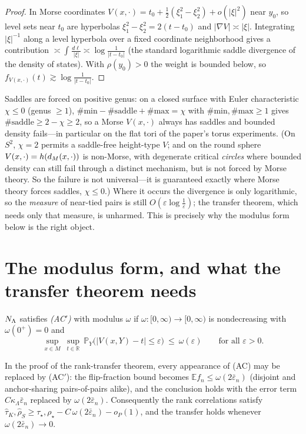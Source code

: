 \begin{proof}
In Morse coordinates $V(x,\cdot)=t_0+\tfrac12(\xi_1^2-\xi_2^2)+o(\lvert\xi\rvert^2)$ near
$y_0$, so level sets near $t_0$ are hyperbolas $\xi_1^2-\xi_2^2=2(t-t_0)$ and
$\lvert\nabla V\rvert\asymp\lvert\xi\rvert$. Integrating $\lvert\xi\rvert^{-1}$ along a
level hyperbola over a fixed coordinate neighborhood gives a contribution
$\asymp\int^{}\!\frac{d\ell}{\lvert\xi\rvert}\asymp\log\frac1{\lvert t-t_0\rvert}$ (the
standard logarithmic saddle divergence of the density of states). With $\rho(y_0)>0$ the
weight is bounded below, so $f_{V(x,\cdot)}(t)\gtrsim\log\frac1{\lvert t-t_0\rvert}$.
\end{proof}

Saddles are forced on positive genus: on a closed surface with Euler characteristic
$\chi\le0$ (genus $\ge1$), $\#\mathrm{min}-\#\mathrm{saddle}+\#\mathrm{max}=\chi$ with
$\#\mathrm{min},\#\mathrm{max}\ge1$ gives $\#\mathrm{saddle}\ge2-\chi\ge2$, so a Morse
$V(x,\cdot)$ always has saddles and bounded density fails---in particular on the flat tori
of the paper's torus experiments. (On $S^2$, $\chi=2$ permits a saddle-free height-type
$V$; and on the round sphere $V(x,\cdot)=h(d_M(x,\cdot))$ is non-Morse, with degenerate
critical \emph{circles} where bounded density can still fail through a distinct mechanism,
but is not forced by Morse theory. So the failure is not universal---it is guaranteed
exactly where Morse theory forces saddles, $\chi\le0$.) Where it occurs the divergence is
only logarithmic, so the \emph{measure} of near-tied pairs is still
$O(\varepsilon\log\frac1\varepsilon)$; the transfer theorem, which needs only that measure,
is unharmed. This is precisely why the modulus form below is the right object.

\section{The modulus form, and what the transfer theorem needs}

\begin{definition}\label{def:acprime}
$N_\Lambda$ satisfies \emph{(AC$'$)} with modulus $\omega$ if $\omega:[0,\infty)\to[0,\infty)$
is nondecreasing with $\omega(0^+)=0$ and
\[
\sup_{x\in M}\ \sup_{t\in\mathbb R}\ \mathbb P_Y\bigl(\lvert V(x,Y)-t\rvert\le\varepsilon\bigr)\ \le\ \omega(\varepsilon)
\qquad\text{for all }\varepsilon>0 .
\]
\end{definition}

\begin{lemma}\label{lem:acprime}
In the proof of the rank-transfer theorem, every appearance of (AC) may be replaced by
(AC$'$): the flip-fraction bound becomes $\mathbb E f_n\le\omega(2\bar\varepsilon_n)$
(disjoint and anchor-sharing pairs-of-pairs alike), and the conclusion holds with the
error term $C\kappa_\Lambda\bar\varepsilon_n$ replaced by $\omega(2\bar\varepsilon_n)$.
Consequently the rank correlations satisfy
$\widehat\tau_K,\widehat\rho_S\ge\tau_\star,\rho_\star-C\,\omega(2\bar\varepsilon_n)-o_P(1)$,
and the transfer holds whenever $\omega(2\bar\varepsilon_n)\to0$.
\end{lemma}


